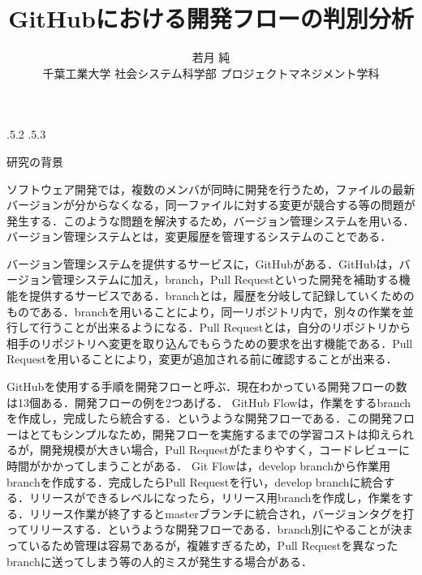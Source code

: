 \documentclass[uplatex,twocolumn]{jsarticle}
\title{\vspace{-14mm}GitHubにおける開発フローの判別分析 \footnotemark[0]}
\author{若月 純 \footnotemark[1] \\ 千葉工業大学 社会システム科学部 プロジェクトマネジメント学科\footnotemark[2]}
\date{}%
\makeatletter
\renewcommand{\section}{%
    \if@slide\clearpage\fi
    \@startsection{section}{1}{\z@}%
    {\Cvs \@plus.5\Cdp \@minus.2\Cdp}%
    {.5\Cvs \@plus.3\Cdp}%
    {\normalfont\raggedright}}
\makeatother
\begin{document}
\lhead{}
\rhead{}
\lfoot{}
\cfoot{}


\twocolumn[
	\maketitle\thispagestyle{fancy}
]
\begingroup
\def\thefootnote{\fnsymbol{footnote}}%
\endgroup

\section{研究の背景}

ソフトウェア開発では，複数のメンバが同時に開発を行うため，ファイルの最新バージョンが分からなくなる，同一ファイルに対する変更が競合する等の問題が発生する．このような問題を解決するため，バージョン管理システムを用いる．バージョン管理システムとは，変更履歴を管理するシステムのことである\cite{ikeda2014}．

バージョン管理システムを提供するサービスに，GitHubがある．GitHubは，バージョン管理システムに加え，branch，Pull Requestといった開発を補助する機能を提供するサービスである．branchとは，履歴を分岐して記録していくためのものである．branchを用いることにより，同一リポジトリ内で，別々の作業を並行して行うことが出来るようになる．Pull Requestとは，自分のリポジトリから相手のリポジトリへ変更を取り込んでもらうための要求を出す機能である．Pull Requestを用いることにより，変更が追加される前に確認することが出来る．

GitHubを使用する手順を開発フローと呼ぶ．現在わかっている開発フローの数は13個ある．開発フローの例を2つあげる．
GitHub Flowは，作業をするbranchを作成し，完成したら統合する．というような開発フローである．この開発フローはとてもシンプルなため，開発フローを実施するまでの学習コストは抑えられるが，開発規模が大きい場合，Pull Requestがたまりやすく，コードレビューに時間がかかってしまうことがある．
Git Flowは，develop branchから作業用branchを作成する．完成したらPull Requestを行い，develop branchに統合する．リリースができるレベルになったら，リリース用branchを作成し，作業をする．リリース作業が終了するとmasterブランチに統合され，バージョンタグを打ってリリースする．というような開発フローである．branch別にやることが決まっているため管理は容易であるが，複雑すぎるため，Pull Requestを異なったbranchに送ってしまう等の人的ミスが発生する場合がある\cite{otsuka2014}．
\end{document}
